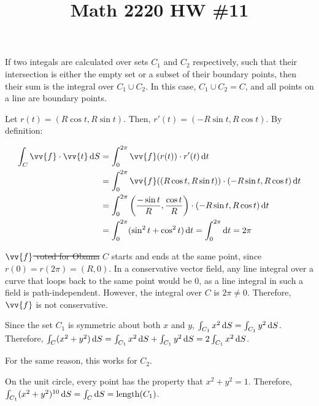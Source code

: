 
\usepackage[normalem]{ulem}

\title{Math 2220 HW \#11}
\author{\name}
\maketitle


If two integals are calculated over sets $C_1$ and $C_2$ respectively, such that their intersection is either the empty set or a subset of their boundary points, then their sum is the integral over $C_1 \cup C_2$. In this case, $C_1 \cup C_2 = C$, and all points on a line are boundary points.


Let $r(t) = (R \cos t, R \sin t)$. Then, $r'(t) = (-R \sin t, R \cos t)$. By definition:

\begin{align*}
  \int_C \vv{f} \cdot \vv{t} \diff S &= \int_0^{2\pi} \vv{f}(r(t)) \cdot r'(t) \diff t \\
  &= \int_0^{2\pi} \vv{f}((R \cos t, R \sin t)) \cdot (-R \sin t, R \cos t) \diff t \\
  &= \int_0^{2\pi} \left(\frac{-\sin t}{R}, \frac{\cos t}{R}\right) \cdot (-R \sin t, R \cos t) \diff t \\
  &= \int_0^{2\pi} (\sin^2 t + \cos^2 t) \diff t = \int_0^{2\pi} \diff t = 2\pi
\end{align*}

\sout{$\vv{f}$ voted for Obama}
$C$ starts and ends at the same point, since $r(0) = r(2\pi) = (R, 0)$. In a conservative vector field, any line integral over a curve that loops back to the same point would be $0$, as a line integral in such a field is path-independent. However, the integral over $C$ is $2\pi \neq 0$. Therefore, $\vv{f}$ is not conservative.


Since the set $C_1$ is symmetric about both $x$ and $y$, $\int_{C_1} x^2 \mathop{}\!\mathrm{d} S = \int_{C_1} y^2 \mathop{}\!\mathrm{d} S$. Therefore, $\int_C (x^2 + y^2) \mathop{}\!\mathrm{d} S = \int_{C_1} x^2 \mathop{}\!\mathrm{d} S + \int_{C_1} y^2 \mathop{}\!\mathrm{d} S = 2\int_{C_1} x^2 \mathop{}\!\mathrm{d} S$.

For the same reason, this works for $C_2$.

On the unit circle, every point has the property that $x^2 + y^2 = 1$. Therefore, $\int_{C_1} (x^2 + y^2)^{10} \mathop{}\!\mathrm{d} S = \int_C \mathop{}\!\mathrm{d} S = \text{length}(C_1)$.

